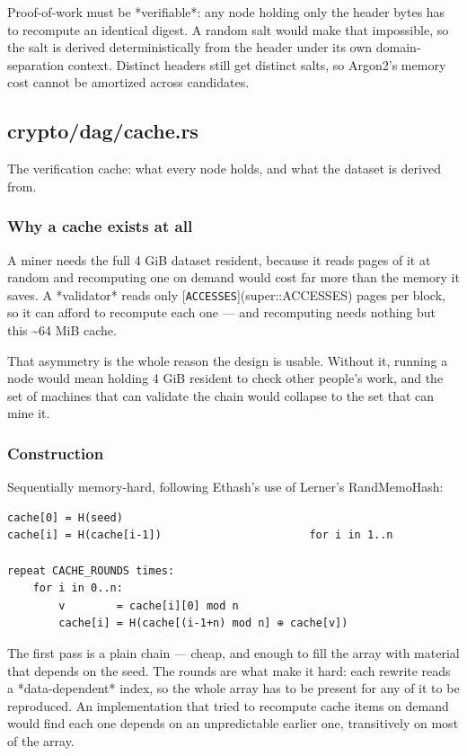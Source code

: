 \documentclass[11pt,a4paper]{article}
\begin{document}
Proof-of-work must be *verifiable*: any node holding only the header bytes
has to recompute an identical digest. A random salt would make that
impossible, so the salt is derived deterministically from the header under
its own domain-separation context. Distinct headers still get distinct
salts, so Argon2's memory cost cannot be amortized across candidates.

\subsection{crypto/dag/cache.rs}
The verification cache: what every node holds, and what the dataset is
derived from.

\subsubsection{Why a cache exists at all}

A miner needs the full 4 GiB dataset resident, because it reads pages of it
at random and recomputing one on demand would cost far more than the memory
it saves. A *validator* reads only [\texttt{ACCESSES}](super::ACCESSES) pages per block, so it can
afford to recompute each one — and recomputing needs nothing but this
\textasciitilde{}64 MiB cache.

That asymmetry is the whole reason the design is usable. Without it, running
a node would mean holding 4 GiB resident to check other people's work, and
the set of machines that can validate the chain would collapse to the set
that can mine it.

\subsubsection{Construction}

Sequentially memory-hard, following Ethash's use of Lerner's RandMemoHash:

\begin{verbatim}
cache[0] = H(seed)
cache[i] = H(cache[i-1])                       for i in 1..n

repeat CACHE_ROUNDS times:
    for i in 0..n:
        v        = cache[i][0] mod n
        cache[i] = H(cache[(i-1+n) mod n] ⊕ cache[v])
\end{verbatim}

The first pass is a plain chain — cheap, and enough to fill the array with
material that depends on the seed. The rounds are what make it hard: each
rewrite reads a *data-dependent* index, so the whole array has to be present
for any of it to be reproduced. An implementation that tried to recompute
cache items on demand would find each one depends on an unpredictable
earlier one, transitively on most of the array.
\end{document}
